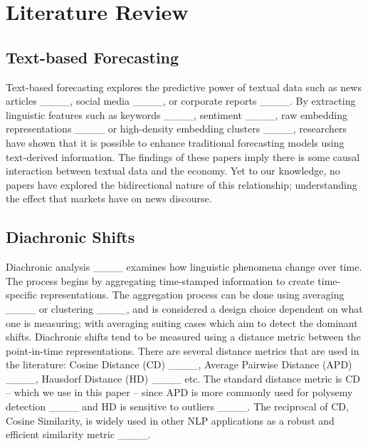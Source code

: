 \section{Literature Review}
\vspace{-0.1cm}

\subsection{Text-based Forecasting}

Text-based forecasting explores the predictive power of textual data such as news articles ____, social media ____, or corporate reports ____. By extracting linguistic features such as keywords ____, sentiment ____, raw embedding representations ____ or high-density embedding clusters ____, researchers have shown that it is possible to enhance traditional forecasting models using text-derived information. The findings of these papers imply there is some causal interaction between textual data and the economy. Yet to our knowledge, no papers have explored the bidirectional nature of this relationship; understanding the effect that markets have on news discourse. 
\vspace{-0.1cm}

\subsection{Diachronic Shifts}
\label{sec:diachronic}

Diachronic analysis ____ examines how linguistic phenomena change over time. The process begins by aggregating time-stamped information to create time-specific representations. The aggregation process can be done using averaging ____ or clustering ____, and is considered a design choice dependent on what one is measuring; with averaging suiting cases which aim to detect the dominant shifts. Diachronic shifts tend to be measured using a distance metric between the point-in-time representations. There are several distance metrics that are used in the literature: Cosine Distance (CD) ____, Average Pairwise Distance (APD) ____, Hausdorf Distance (HD) ____ etc. The standard distance metric is CD -- which we use in this paper -- since APD is more commonly used for polysemy detection ____ and HD is sensitive to outliers ____. The reciprocal of CD, Cosine Similarity, is widely used in other NLP applications as a robust and efficient similarity metric ____. 
\vspace{-0.1cm}


